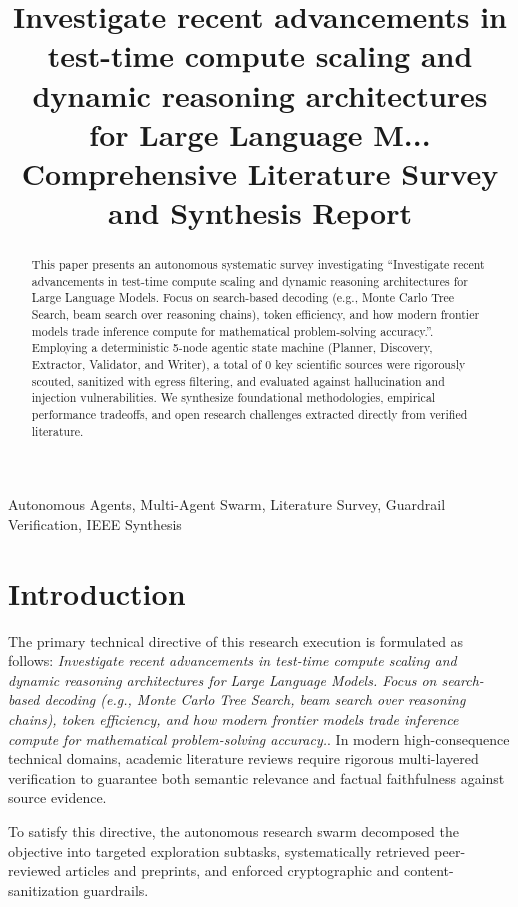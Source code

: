 \documentclass[conference]{IEEEtran}
\title{Investigate recent advancements in test-time compute scaling and dynamic reasoning architectures for Large Language M...\\
\large Comprehensive Literature Survey and Synthesis Report}
\author{\IEEEauthorblockN{Autonomous Multi-Agent Research Swarm}
\IEEEauthorblockA{\textit{Distributed Agentic Intelligence Core} \\
Auto Research Swarm Engine \\
Synthesis Run Date: October 11, 2026 \\
\texttt{swarm-core@autoresearchswarm.com}}
}
\begin{document}
\maketitle

\begin{abstract}
This paper presents an autonomous systematic survey investigating ``Investigate recent advancements in test-time compute scaling and dynamic reasoning architectures for Large Language Models. Focus on search-based decoding (e.g., Monte Carlo Tree Search, beam search over reasoning chains), token efficiency, and how modern frontier models trade inference compute for mathematical problem-solving accuracy.''. Employing a deterministic 5-node agentic state machine (Planner, Discovery, Extractor, Validator, and Writer), a total of 0 key scientific sources were rigorously scouted, sanitized with egress filtering, and evaluated against hallucination and injection vulnerabilities. We synthesize foundational methodologies, empirical performance tradeoffs, and open research challenges extracted directly from verified literature.
\end{abstract}

\begin{IEEEkeywords}
Autonomous Agents, Multi-Agent Swarm, Literature Survey, Guardrail Verification, IEEE Synthesis
\end{IEEEkeywords}

\section{Introduction}
The primary technical directive of this research execution is formulated as follows: \textit{Investigate recent advancements in test-time compute scaling and dynamic reasoning architectures for Large Language Models. Focus on search-based decoding (e.g., Monte Carlo Tree Search, beam search over reasoning chains), token efficiency, and how modern frontier models trade inference compute for mathematical problem-solving accuracy.}. In modern high-consequence technical domains, academic literature reviews require rigorous multi-layered verification to guarantee both semantic relevance and factual faithfulness against source evidence.

To satisfy this directive, the autonomous research swarm decomposed the objective into targeted exploration subtasks, systematically retrieved peer-reviewed articles and preprints, and enforced cryptographic and content-sanitization guardrails.
\end{document}

